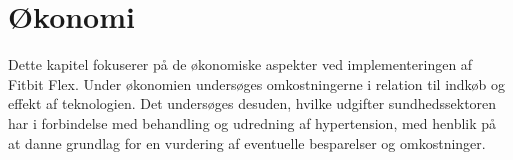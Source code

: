 \chapter{Økonomi}
Dette kapitel fokuserer på de økonomiske aspekter ved implementeringen af Fitbit Flex. Under økonomien undersøges omkostningerne i relation til indkøb og effekt af teknologien. Det undersøges desuden, hvilke udgifter sundhedssektoren har i forbindelse med behandling og udredning af hypertension, med henblik på at danne grundlag for en vurdering af eventuelle besparelser og omkostninger. 